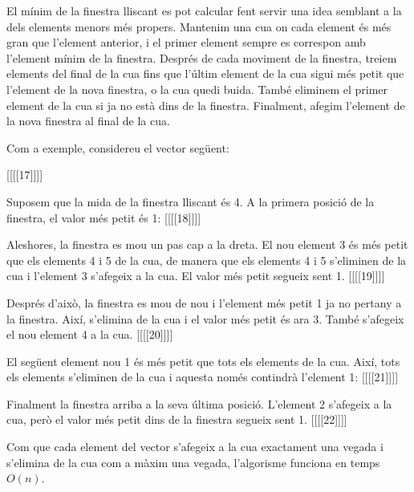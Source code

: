 El mínim de la finestra lliscant es pot calcular fent servir una idea
semblant a la dels elements menors més propers. Mantenim una cua on
cada element és més gran que l'element anterior, i el primer element
sempre es correspon amb l'element mínim de la finestra. Després de
cada moviment de la finestra, treiem elements del final de la cua fins
que l'últim element de la cua sigui més petit que l'element de la
nova finestra, o la cua quedi buida. També eliminem el primer element
de la cua si ja no està dins de la finestra. Finalment, afegim l'element
de la nova finestra al final de la cua.

Com a exemple, considereu el vector següent:


[[[[17]]]]


Suposem que la mida de la finestra lliscant és 4. A la primera posició
de la finestra, el valor més petit és 1:
[[[[18]]]]


Aleshores, la finestra es mou un pas cap a la dreta. El nou element 3
és més petit que els elements 4 i 5 de la cua, de manera que els
elements 4 i 5 s'eliminen de la cua i l'element 3 s'afegeix a la
cua. El valor més petit segueix sent 1.
[[[[19]]]]


Després d'això, la finestra es mou de nou i l'element més petit 1 ja
no pertany a la finestra. Així, s'elimina de la cua i el valor més
petit és ara 3. També s'afegeix el nou element 4 a la cua.
[[[[20]]]]


El següent element nou 1 és més petit que tots els elements de la
cua. Així, tots els elements s'eliminen de la cua i aquesta només
contindrà l'element 1:
[[[[21]]]]


Finalment la finestra arriba a la seva última posició. L'element 2
s'afegeix a la cua, però el valor més petit dins de la finestra
segueix sent 1.
[[[[22]]]]


Com que cada element del vector s'afegeix a la cua exactament una
vegada i s'elimina de la cua com a màxim una vegada, l'algorisme
funciona en temps $O(n)$.
